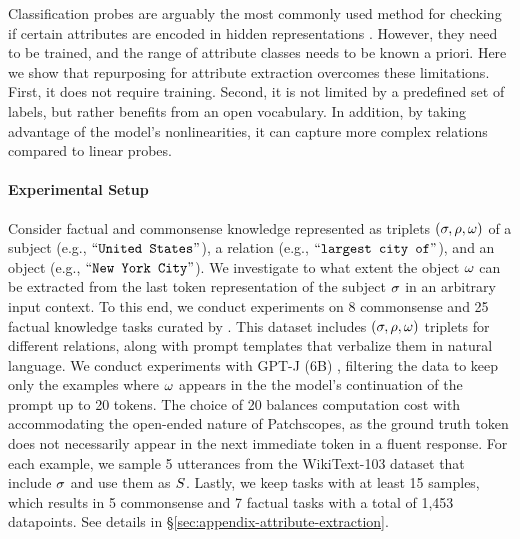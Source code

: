 \documentclass{article}
\theoremstyle{plain}
\theoremstyle{definition}
\theoremstyle{remark}
\begin{document}
Classification probes are arguably the most commonly used method for checking if certain attributes are encoded in hidden representations \cite{belinkov2022probing, belinkov2019analysis}. However, they need to be trained, and the range of attribute classes needs to be known a priori. Here we show that repurposing \methodFamilyName{} for attribute extraction overcomes these limitations. First, it does not require training. Second, it is not limited by a predefined set of labels, but rather benefits from an open vocabulary. In addition, by taking advantage of the model's nonlinearities, it can capture more complex relations compared to linear probes.

\paragraph{Experimental Setup}
Consider factual and commonsense knowledge represented as triplets $(\sigma, \rho, \omega)$ of a subject (e.g., $``\texttt{United States}"$), a relation (e.g., $``\texttt{largest city of}"$), and an object (e.g., $``\texttt{New York City}"$).
We investigate to what extent the object $\omega$ can be extracted from the last token representation of the subject $\sigma$ in an arbitrary input context. %
To this end, we conduct experiments on 8 commonsense and 25 factual knowledge tasks curated by \citet{hernandez2023linearity}. This dataset includes $(\sigma, \rho, \omega)$ triplets for different relations, along with prompt templates that verbalize them in natural language. 
We conduct experiments with GPT-J (6B) \citep{gpt-j}, filtering the data to keep only the examples where $\omega$ appears in the the model's continuation of the prompt up to 20 tokens.
The choice of 20 balances computation cost with accommodating the open-ended nature of Patchscopes, as the ground truth token does not necessarily appear in the next immediate token in a fluent response.
For each example, we sample 5 utterances from the WikiText-103 dataset \cite{merity2016pointer} that include $\sigma$ and use them as $S$. Lastly, we keep tasks with at least 15 samples, which results in 5 commonsense and 7 factual tasks with a total of 1,453 datapoints.
See details in \S{\ref{sec:appendix-attribute-extraction}}.
\end{document}

